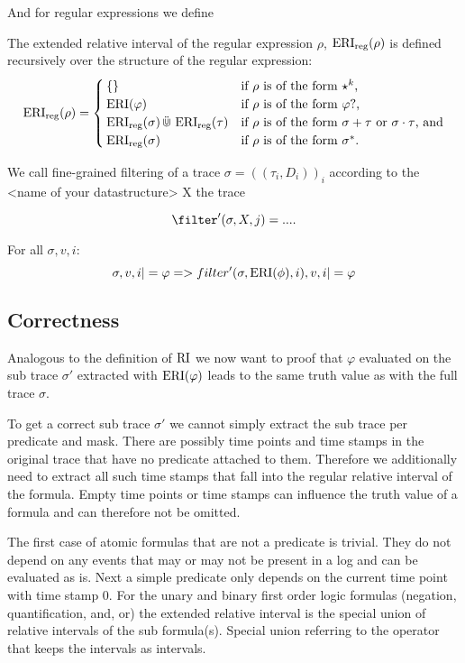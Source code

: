 And for regular expressions we define 
\begin{definition}
    The extended relative interval of the regular expression $\rho$, $\operatorname{ERI}_{\text{reg}}(\rho)$ is defined recursively over the structure of the regular expression:
    \begin{equation*}
        \operatorname{ERI}_{\text{reg}}(\rho) =
        \begin{cases}
            \{\} & \text{if $\rho$ is of the form $\star^k$,} \\
            \operatorname{ERI}(\varphi) & \text{if $\rho$ is of the form $\varphi ?$,} \\
            \operatorname{ERI}_{\text{reg}}(\sigma) \,\ddot{\Cup}\, \operatorname{ERI}_{\text{reg}}(\tau) & \text{if $\rho$ is of the form $\sigma + \tau$ or $\sigma \cdot \tau$, and} \\
            \operatorname{ERI}_{\text{reg}}(\sigma) & \text{if $\rho$ is of the form $\sigma^*$.}
        \end{cases}
    \end{equation*}
\end{definition}

\begin{definition}
    We call fine-grained filtering of a trace $\sigma=((\tau_i,D_i))_i$ according to the <name of your datastructure> X the trace 
    
    \begin{equation*}
        \filter'(\sigma, X, j) = ....
    \end{equation*}
\end{definition} 

\begin{theorem}
    For all $\sigma, v, i$:
    \begin{equation*}
        \sigma, v, i |= \varphi => filter'(\sigma, \operatorname{ERI}(\phi), i), v, i |= \varphi
    \end{equation*}
\end{theorem} 

\subsection{Correctness}
Analogous to the definition of $\operatorname{RI}$ we now want to proof that $\varphi$ evaluated on the sub trace $\sigma'$ extracted with $\operatorname{ERI}(\varphi)$ leads to the same truth value as with the full trace $\sigma$.

To get a correct sub trace $\sigma'$ we cannot simply extract the sub trace per predicate and mask.
There are possibly time points and time stamps in the original trace that have no predicate attached to them.
Therefore we additionally need to extract all such time stamps that fall into the regular relative interval of the formula.
Empty time points or time stamps can influence the truth value of a formula and can therefore not be omitted.

The first case of atomic formulas that are not a predicate is trivial.
They do not depend on any events that may or may not be present in a log and can be evaluated as is.
Next a simple predicate only depends on the current time point with time stamp $0$.
For the unary and binary first order logic formulas (negation, quantification, and, or) the extended relative interval is the special union of relative intervals of the sub formula(s).
Special union referring to the operator that keeps the intervals as intervals.